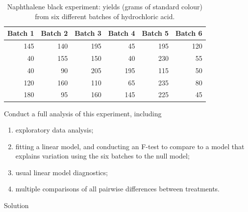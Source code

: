 \documentclass[
]{book}
\providecommand{\tightlist}{%
  \setlength{\itemsep}{0pt}\setlength{\parskip}{0pt}}
\theoremstyle{definition}
\theoremstyle{definition}
\theoremstyle{definition}
\theoremstyle{definition}
\theoremstyle{remark}
\begin{document}
\begin{enumerate}
  \begin{table}

   \caption{\label{tab:nap-black}Naphthalene black experiment: yields (grams of standard colour) from six different batches of hydrochloric acid.}
   \centering
   \begin{tabular}[t]{r|r|r|r|r|r}
   \hline
   Batch 1 & Batch 2 & Batch 3 & Batch 4 & Batch 5 & Batch 6\\
   \hline
   145 & 140 & 195 & 45 & 195 & 120\\
   \hline
   40 & 155 & 150 & 40 & 230 & 55\\
   \hline
   40 & 90 & 205 & 195 & 115 & 50\\
   \hline
   120 & 160 & 110 & 65 & 235 & 80\\
   \hline
   180 & 95 & 160 & 145 & 225 & 45\\
   \hline
   \end{tabular}
   \end{table}

  Conduct a full analysis of this experiment, including

  \begin{enumerate}
  \def\labelenumii{\alph{enumii}.}
  \tightlist
  \item
    exploratory data analysis;
  \item
    fitting a linear model, and conducting an F-test to compare to a model that explains variation using the six batches to the null model;
  \item
    usual linear model diagnostics;
  \item
    multiple comparisons of all pairwise differences between treatments.
  \end{enumerate}
\end{enumerate}

Solution
\end{document}
